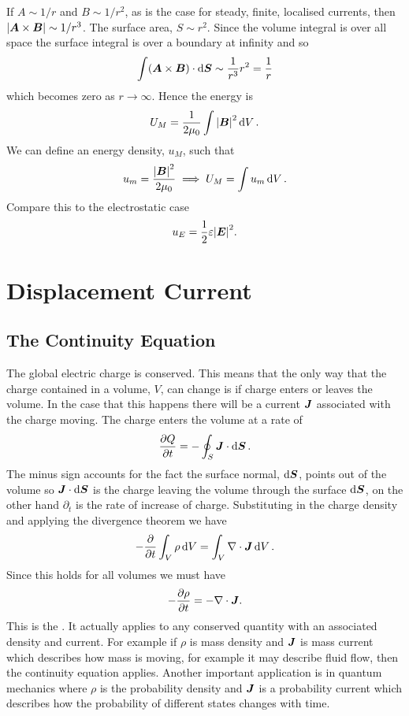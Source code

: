     If \(A\sim 1/r\) and \(B\sim 1/r^2\), as is the case for steady, finite, localised currents, then \(\abs{\bm{A}\times\bm{B}}\sim 1/r^3\).
    The surface area, \(S\sim r^2\).
    Since the volume integral is over all space the surface integral is over a boundary at infinity and so
    \[\int(\bm{A}\times\bm{B})\cdot\dd{\bm{S}} \sim \frac{1}{r^3}r^2 = \frac{1}{r}\]
    which becomes zero as \(r\to\infty\).
    Hence the energy is
    \[U_M = \frac{1}{2\mu_0}\int\abs{\bm{B}}^2\dd{V}.\]
    We can define an energy density, \(u_M\), such that
    \[u_m = \frac{\abs{\bm{B}}^2}{2\mu_0} \implies U_M = \int u_m\dd{V}.\]
    Compare this to the electrostatic case
    \[u_E = \frac{1}{2}\varepsilon\abs{\bm{E}}^2.\]
    
    \section{Displacement Current}
    \subsection{The Continuity Equation}
    The global electric charge is conserved.
    This means that the only way that the charge contained in a volume, \(V\), can change is if charge enters or leaves the volume.
    In the case that this happens there will be a current \(\bm{J}\) associated with the charge moving.
    The charge enters the volume at a rate of
    \[\pdv{Q}{t} = -\oint_S\bm{J}\cdot\dd{\bm{S}}.\]
    The minus sign accounts for the fact the surface normal, \(\dd{\bm{S}}\), points out of the volume so \(\bm{J}\cdot\dd{\bm{S}}\) is the charge leaving the volume through the surface \(\dd{\bm{S}}\), on the other hand \(\partial_t\) is the rate of increase of charge.
    Substituting in the charge density and applying the divergence theorem we have
    \[-\pdv{t}\int_{V}\rho\dd{V} = \int_V \nabla\cdot\bm{J}\dd{V}.\]
    Since this holds for all volumes we must have
    \[-\pdv{\rho}{t} = -\nabla\cdot\bm{J}.\]
    This is the .
    It actually applies to any conserved quantity with an associated density and current.
    For example if \(\rho\) is mass density and \(\bm{J}\) is mass current which describes how mass is moving, for example it may describe fluid flow, then the continuity equation applies.
    Another important application is in quantum mechanics where \(\rho\) is the probability density and \(\bm{J}\) is a probability current which describes how the probability of different states changes with time.
    
